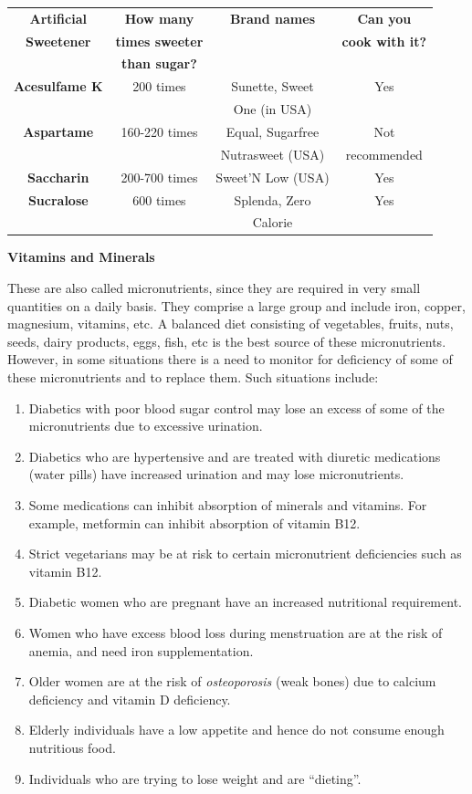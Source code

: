 \begin{tabular}{|c|c|c|c|}
\hline
\textbf{Artificial} & \textbf{How many} & \textbf{Brand names} & \textbf{Can you}\\
\textbf{Sweetener} & \textbf{times sweeter} &  & \textbf{cook with it?}\\
 & \textbf{than sugar?} &  &\\
\hline
\textbf{Acesulfame K} & 200 times & Sunette, Sweet & Yes\\
 &  & One (in USA) & \\
\hline
\textbf{Aspartame} & 160-220 times & Equal, Sugarfree & Not\\
 &  & Nutrasweet (USA) & recommended\\
\hline
\textbf{Saccharin} & 200-700 times & Sweet’N Low (USA) & Yes\\
\hline
\textbf{Sucralose} & 600 times & Splenda, Zero & Yes\\
 &  & Calorie & \\
\hline
\end{tabular}

\noindent\textbf{Vitamins and Minerals}

These are also called micronutrients, since they are required in very small quantities on a daily basis. They comprise a large group and include iron, copper, magnesium, vitamins, etc. A balanced diet consisting of vegetables, fruits, nuts, seeds, dairy products, eggs, fish, etc is the best source of these micronutrients. However, in some situations there is a need to monitor for deficiency of some of these micronutrients and to replace them. Such situations include:

\begin{enumerate}[•]
\itemsep=0pt
\item Diabetics with poor blood sugar control may lose an excess of some of the micronutrients due to excessive urination.
\item Diabetics who are hypertensive and are treated with diuretic medications (water pills) have increased urination and may lose micronutrients.
\item Some medications can inhibit absorption of minerals and vitamins. For example, metformin can inhibit absorption of vitamin B12.
\item Strict vegetarians may be at risk to certain micronutrient deficiencies such as vitamin B12.
\item Diabetic women who are pregnant have an increased nutritional requirement.
\item Women who have excess blood loss during menstruation are at the risk of anemia, and need iron supplementation.
\item Older women are at the risk of \textit{osteoporosis} (weak bones) due to calcium deficiency and vitamin D deficiency.
\item Elderly individuals have a low appetite and hence do not consume enough nutritious food.
\item Individuals who are trying to lose weight and are “dieting”.
\end{enumerate}

